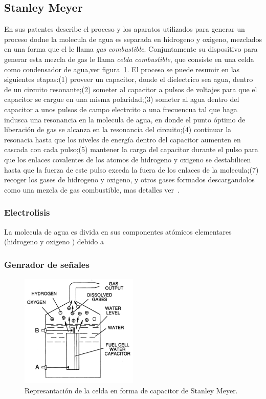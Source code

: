 \documentclass[12pt,twoside,onecolumn]{article}
\begin{document}
\subsection{Stanley Meyer} En sus patentes describe el proceso y los aparatos utilizados para generar un proceso dodne la molecula de agua es separada en hidrogeno y oxigeno, mezclados en una forma que el le llama \emph{gas combustible}. Conjuntamente su dispositivo para generar esta mezcla de gas le llama \emph{celda combustible}, que consiste en una celda como condensador de agua,ver figura~\ref{fig:wfcc}. El proceso se puede resumir en las siguientes etapas:(1) proveer un capacitor, donde el dielectrico sea agua, dentro de un circuito resonante;(2) someter al capacitor a pulsos de voltajes para que el capacitor se cargue en una misma polaridad;(3) someter al agua dentro del capacitor a unos pulsos de campo electrcito a una frecuencua tal que haga indusca una resonancia en la molecula de agua, en donde el punto óptimo de liberación de gas se alcanza en la resonancia del circuito;(4) continuar la resonacia hasta que los niveles de energía dentro del capacitor aumenten en cascada con cada pulso;(5) mantener la carga del capacitor durante el pulso para que los enlaces covalentes de los atomos de hidrogeno y oxigeno se destabilicen hasta que la fuerza de este pulso exceda la fuera de los enlaces de la molecula;(7) recoger los gases de hidrogeno y oxigeno, y otros gases formados descargandolos como una mezcla de gas combustible, mas detalles ver~\cite{meyer1990method}.


\subsubsection{Electrolisis}
La molecula de agua es divida en sus componentes atómicos elementares (hidrogeno y oxigeno ) debido a 
\subsubsection{Genrador de señales}

\begin{figure}
  \centering
   \includegraphics[width=0.5\textwidth]{figures/wfccapacitor}
  \caption{Represantación de la celda en forma de capacitor de Stanley Meyer.}
  \label{fig:wfcc}
\end{figure}
\end{document}
